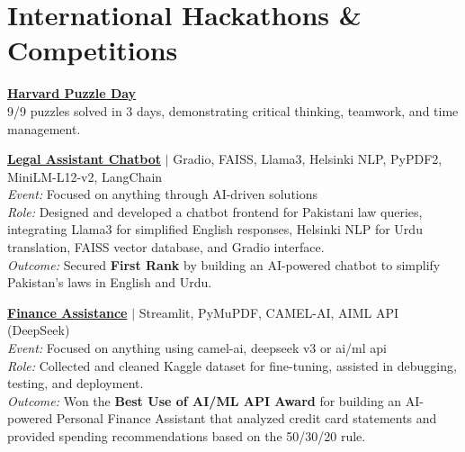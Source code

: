 \documentclass[a4paper,12pt]{article}
\begin{document}
\section{International Hackathons \& Competitions}

\textbf{\href{https://www.linkedin.com/posts/muhammad-qasim-gill_cs50-harvard-puzzleday2025-activity-7316559580790972418-4B6G?utm_source=share&utm_medium=member_desktop&rcm=ACoAACG6gOwBnlfoWP0KSUXYMZV0hE4WXwmWsBQ}{Harvard Puzzle Day}} \\
9/9 puzzles solved in 3 days, demonstrating critical thinking, teamwork, and time management.

\vspace{0.5em}

\textbf{\href{https://www.linkedin.com/feed/update/urn:li:activity:7304649229472309248/}{Legal Assistant Chatbot}} 
$|$ Gradio, FAISS, Llama3, Helsinki NLP, PyPDF2, MiniLM-L12-v2, LangChain \\
\textit{Event:} Focused on anything through AI-driven solutions \\
\textit{Role:} Designed and developed a chatbot frontend for Pakistani law queries, integrating Llama3 for simplified English responses, Helsinki NLP for Urdu translation, FAISS vector database, and Gradio interface. \\
\textit{Outcome:} Secured \textbf{First Rank} by building an AI-powered chatbot to simplify Pakistan’s laws in English and Urdu.

\vspace{0.5em}

\textbf{\href{https://lablab.ai/event/fall-in-love-with-deepseek/shallowseekers/ai-powered-personal-finance-assistant}{Finance Assistance}} 
$|$ Streamlit, PyMuPDF, CAMEL-AI, AIML API (DeepSeek) \\
\textit{Event:} Focused on anything using camel-ai, deepseek v3 or ai/ml api \\
\textit{Role:} Collected and cleaned Kaggle dataset for fine-tuning, assisted in debugging, testing, and deployment. \\
\textit{Outcome:} Won the \textbf{Best Use of AI/ML API Award} for building an AI-powered Personal Finance Assistant that analyzed credit card statements and provided spending recommendations based on the 50/30/20 rule.
\end{document}
